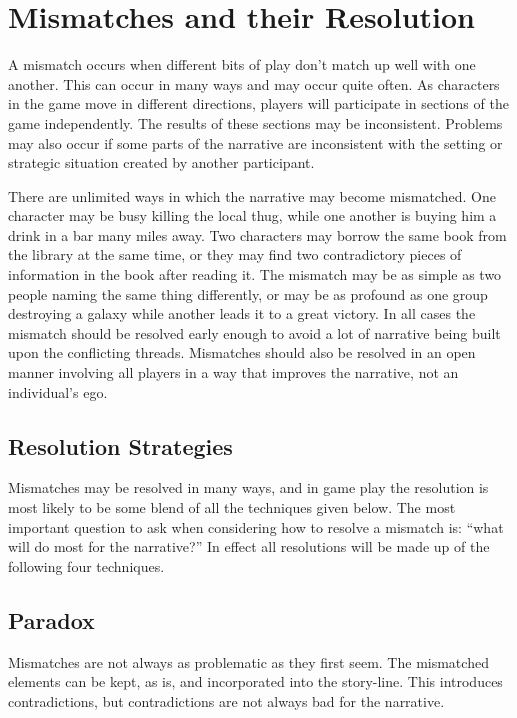\documentclass[twoside]{book}
\begin{document}
\chapter{Mismatches and their Resolution}

A mismatch occurs when different bits of play don't match up well with
one another. This can occur in many ways and may occur quite often. As
characters in the game move in different directions, players will
participate in sections of the game independently. The results of
these sections may be inconsistent. Problems may also occur if some
parts of the narrative are inconsistent with the setting or strategic
situation created by another participant.

There are unlimited ways in which the narrative may become
mismatched. One character may be busy killing the local thug, while
one another is buying him a drink in a bar many miles away. Two
characters may borrow the same book from the library at the same time,
or they may find two contradictory pieces of information in the book
after reading it. The mismatch may be as simple as two people naming
the same thing differently, or may be as profound as one group
destroying a galaxy while another leads it to a great victory. In all
cases the mismatch should be resolved early enough to avoid a lot of
narrative being built upon the conflicting threads. Mismatches should
also be resolved in an open manner involving all players in a way that
improves the narrative, not an individual's ego.

\section{Resolution Strategies}

Mismatches may be resolved in many ways, and in game play the
resolution is most likely to be some blend of all the techniques given
below. The most important question to ask when considering how to
resolve a mismatch is: ``what will do most for the narrative?'' In
effect all resolutions will be made up of the following four
techniques.

\section{Paradox}

Mismatches are not always as problematic as they first seem. The
mismatched elements can be kept, as is, and incorporated into the
story-line. This introduces contradictions, but contradictions are not
always bad for the narrative.
\end{document}
